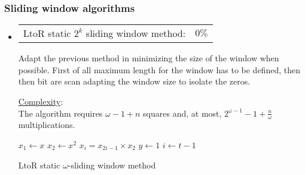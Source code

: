 \newpage
\subsubsection{Sliding window algorithms}
\begin{itemize}
\item  	
		\begin{tabularx}{\linewidth}{ p{16cm} p{1.5cm} }
		LtoR static $2^k$ sliding window method:  & $0\%$ 
		\end{tabularx}	
			\noindent
			Adapt the previous method in minimizing the size of the window when possible.
			First of all maximum length for the window has to be defined, then then bit are scan 
			adapting the window size to isolate the zeros.
			
		\underline{Complexity}:\\
			The algorithm requires   $\omega - 1 + n$ squares 
			and, at most, $2^{\omega-1} - 1 +  \frac{n}{\omega}$  multiplications.
			\vspace{3mm}
		
\begin{algorithm}[h]
	$x_1 \leftarrow x$	\; 
	$x_2 \leftarrow x^2$	\;		
	{						     
		$x_i = x_{2i -1} \times x_2$ \;
	}
	$y \leftarrow 1$	\;
	$i \leftarrow t-1 $ \;
	{			 
         
	}				 
	\;
	\caption{LtoR static $\omega$-sliding window method}
\end{algorithm}


\end{itemize}

